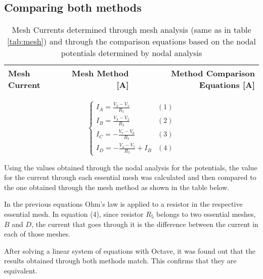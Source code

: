 \subsection{Comparing both methods}
\label{sec:comparison}
\par
\begin{table}[hbt!]
  \centering
  \begin{tabular}{|l|r|r|}
    \hline    
    {\bf Mesh Current} & {\bf Mesh Method [A]} & {\bf Method Comparison Equations [A]} \\ \hline
    
  \end{tabular}
  \caption{Mesh Currents determined through mesh analysis (same as in table \ref{tab:mesh}) and through the comparison equations based on the nodal potentials determined by nodal analysis}
  \label{tab:comp}
\end{table}



\begin{equation}
\begin{cases}
I_A= \frac{V_2-V_1}{R_1} & \mbox{$(1)$}\\
I_B= \frac{V_3-V_2}{R_2} & \mbox{$(2)$}\\
I_C= -\frac{V_7-V_6}{R_7} & \mbox{$(3)$}\\
I_D= -\frac{V_4-V_5}{R_5} +I_B & \mbox{$(4)$}
\end{cases}
\end{equation}

\par
Using the values obtained through the nodal analysis for the potentials, the value for the current through each essential mesh was calculated and then compared to the one obtained through the mesh method as shown in the table below.

\par
In the previous equations Ohm's law is applied to a resistor in the respective essential mesh. In equation (4), since resistor $R_5$ belongs to two essential meshes, $B$ and $D$, the current that goes through it is the difference between the current in each of those meshes.

\par
After solving a linear system of equations with Octave, it was found out that the results obtained through both methods match. This confirms that they are equivalent.
